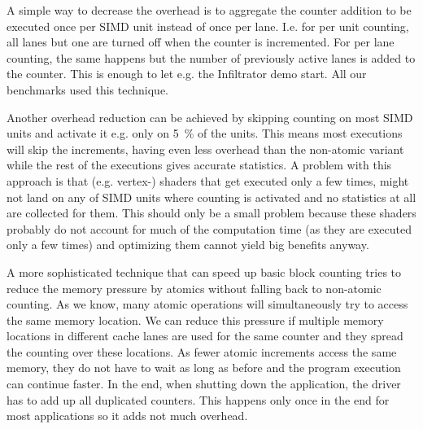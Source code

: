 A simple way to decrease the overhead is to aggregate the counter addition to be executed once per SIMD unit instead of once per lane.
I.e. for per unit counting, all lanes but one are turned off when the counter is incremented.
For per lane counting, the same happens but the number of previously active lanes is added to the counter.
This is enough to let e.g. the Infiltrator demo start.
All our benchmarks used this technique.

Another overhead reduction can be achieved by skipping counting on most SIMD units and activate it e.g. only on \SI{5}{\percent} of the units.
This means most executions will skip the increments, having even less overhead than the non-atomic variant while the rest of the executions gives accurate statistics.
A problem with this approach is that (e.g. vertex-) shaders that get executed only a few times, might not land on any of SIMD units where counting is activated and no statistics at all are collected for them.
This should only be a small problem because these shaders probably do not account for much of the computation time (as they are executed only a few times) and optimizing them cannot yield big benefits anyway.

A more sophisticated technique that can speed up basic block counting tries to reduce the memory pressure by atomics without falling back to non-atomic counting.
As we know, many atomic operations will simultaneously try to access the same memory location.
We can reduce this pressure if multiple memory locations in different cache lanes are used for the same counter and they spread the counting over these locations.
As fewer atomic increments access the same memory, they do not have to wait as long as before and the program execution can continue faster.
In the end, when shutting down the application, the driver has to add up all duplicated counters.
This happens only once in the end for most applications so it adds not much overhead.
